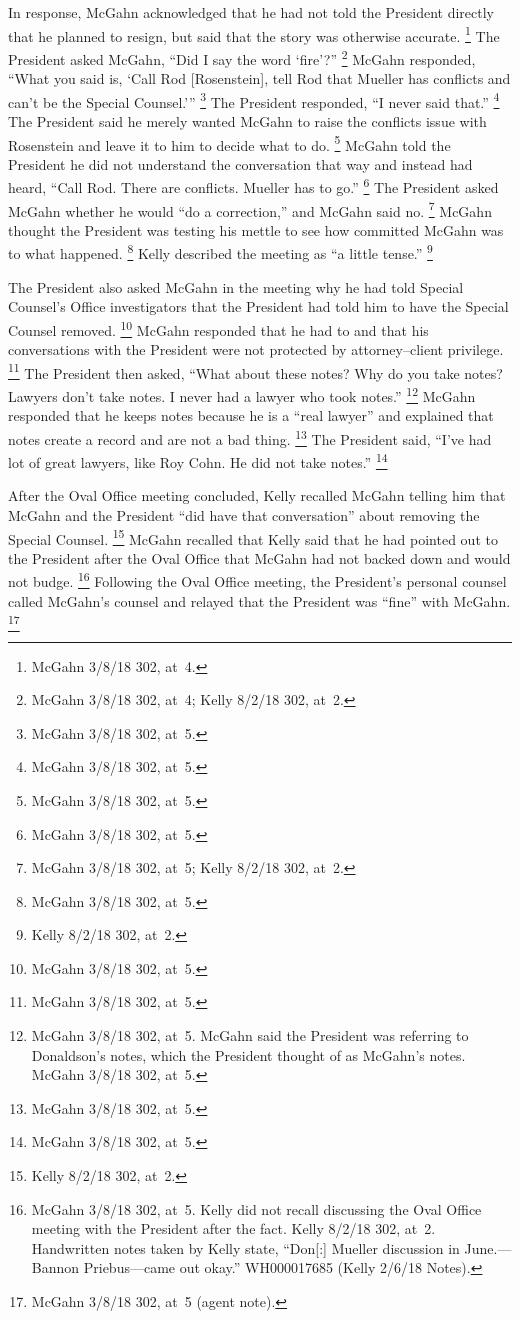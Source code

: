 In response, McGahn acknowledged that he had not told the President directly that he planned to resign, but said that the story was otherwise accurate.%
\footnote{McGahn 3/8/18 302, at~4.}
The President asked McGahn, ``Did I say the word `fire'?''%
\footnote{McGahn 3/8/18 302, at~4; Kelly 8/2/18 302, at~2.}
McGahn responded, ``What you said is, `Call Rod [Rosenstein], tell Rod that Mueller has conflicts and can't be the Special Counsel.'\thinspace''%
\footnote{McGahn 3/8/18 302, at~5.}
The President responded, ``I never said that.''%
\footnote{McGahn 3/8/18 302, at~5.}
The President said he merely wanted McGahn to raise the conflicts issue with Rosenstein and leave it to him to decide what to do.%
\footnote{McGahn 3/8/18 302, at~5.}
McGahn told the President he did not understand the conversation that way and instead had heard, ``Call Rod.
There are conflicts.
Mueller has to go.''%
\footnote{McGahn 3/8/18 302, at~5.}
The President asked McGahn whether he would ``do a correction,'' and McGahn said no.%
\footnote{McGahn 3/8/18 302, at~5; Kelly 8/2/18 302, at~2.}
McGahn thought the President was testing his mettle to see how committed McGahn was to what happened.%
\footnote{McGahn 3/8/18 302, at~5.}
Kelly described the meeting as ``a little tense.''%
\footnote{Kelly 8/2/18 302, at~2.}

The President also asked McGahn in the meeting why he had told Special Counsel's Office investigators that the President had told him to have the Special Counsel removed.%
\footnote{McGahn 3/8/18 302, at~5.}
McGahn responded that he had to and that his conversations with the President were not protected by attorney--client privilege.%
\footnote{McGahn 3/8/18 302, at~5.}
The President then asked, ``What about these notes? Why do you take notes? Lawyers don't take notes.
I never had a lawyer who took notes.''%
\footnote{McGahn 3/8/18 302, at~5.
McGahn said the President was referring to Donaldson's notes, which the President thought of as McGahn's notes.
McGahn 3/8/18 302, at~5.}
McGahn responded that he keeps notes because he is a ``real lawyer'' and explained that notes create a record and are not a bad thing.%
\footnote{McGahn 3/8/18 302, at~5.}
The President said, ``I've had lot of great lawyers, like Roy Cohn.
He did not take notes.''%
\footnote{McGahn 3/8/18 302, at~5.}

After the Oval Office meeting concluded, Kelly recalled McGahn telling him that McGahn and the President ``did have that conversation'' about removing the Special Counsel.%
\footnote{Kelly 8/2/18 302, at~2.}
McGahn recalled that Kelly said that he had pointed out to the President after the Oval Office that McGahn had not backed down and would not budge.%
\footnote{McGahn 3/8/18 302, at~5.
Kelly did not recall discussing the Oval Office meeting with the President after the fact.
Kelly 8/2/18 302, at~2.
Handwritten notes taken by Kelly state, ``Don[:] Mueller discussion in June.---Bannon Priebus---came out okay.''
WH000017685 (Kelly 2/6/18 Notes).}
Following the Oval Office meeting, the President's personal counsel called McGahn's counsel and relayed that the President was ``fine'' with McGahn.%
\footnote{McGahn 3/8/18 302, at~5 (agent note).}

